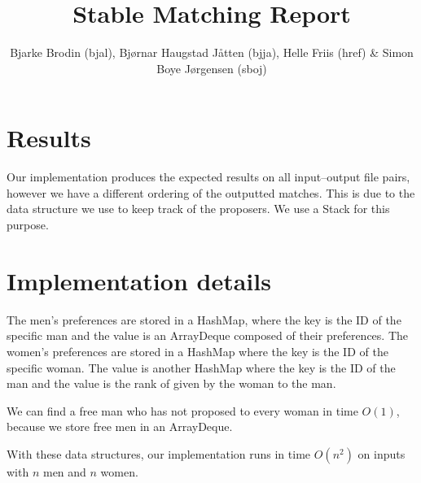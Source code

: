 \documentclass{tufte-handout}
\title{Stable Matching Report}
\author{Bjarke Brodin (bjal), Bjørnar Haugstad Jåtten (bjja), Helle Friis (href) & Simon Boye Jørgensen (sboj)}
\begin{document}
  \maketitle

  \section{Results}

  Our implementation produces the expected results on all input--output file pairs, however we have a different ordering of the outputted matches.
  This is due to the data structure we use to keep track of the proposers. We use a Stack for this purpose.

  \section{Implementation details}

  The men's preferences are stored in a HashMap, where the key is the ID of the specific man and the value is an ArrayDeque composed of their preferences.
  The women's preferences are stored in a HashMap where the key is the ID of the specific woman. 
  The value is another HashMap where the key is the ID of the man and the value is the rank of given by the woman to the man.

  We can find a free man who has not proposed to every woman in time $O(1)$,
  because we store free men in an ArrayDeque.

  With these data structures, our implementation runs in time $O(n^2)$ on inputs with $n$ men and $n$ women.
\end{document}
